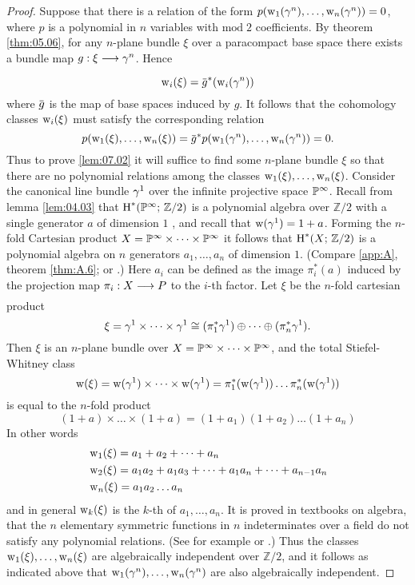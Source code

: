 \documentclass[../main]{subfiles}
\begin{document}
\begin{proof}
Suppose that there is a relation of the form $p(\operatorname{w}_{1}(\gamma^{n}), \dots,\operatorname{w}_{n}(\gamma^{n}))=0$, where $p$ is a polynomial in $n$ variables with $\mathrm{mod}\; 2$ coefficients. By theorem \ref{thm:05.06}, for any $n$-plane bundle $\xi$ over a paracompact base space there exists a bundle map $g:\xi\varrightarrow{} \tautological^n$. Hence
\[\sw_{i}(\xi)=\xoverline{g}^{\ast}(\sw_{i}(\tautological^{n}))\]
where $\xoverline{g}$ is the map of base spaces induced by $g$. It follows that the cohomology classes $\operatorname{w}_{i}(\xi)$ must satisfy the corresponding relation
\[p(\sw_{1}(\xi), \dots, \sw_{n}(\xi))=\xoverline{g}^{\ast} p(\sw_{1}(\tautological^{n}), \dots, \sw_{n}(\tautological^{n}))=0.\]
Thus to prove \ref{lem:07.02} it will suffice to find some $n$-plane bundle $\xi$ so that there are no polynomial relations among the classes $\operatorname{w}_{1}(\xi), \dots, \operatorname{w}_{n}(\xi)$. Consider the canonical line bundle $\gamma^{1}$ over the infinite projective space $\mathbb{P}^\infty $. Recall from lemma \ref{lem:04.03} that $\operatorname{H}^{\ast}(\mathbb{P}^\infty ; \, \mathbb{Z} / 2)$ is a polynomial algebra over $\mathbb{Z} / 2$ with a single generator $a$ of dimension $1$ , and recall that $\operatorname{w}(\gamma^{1})=1+a$. Forming the $n$-fold Cartesian product $X=\mathbb{P}^\infty \times \dots \times \mathbb{P}^\infty$ it follows that $\operatorname{H}^{\ast}(X ; \, \mathbb{Z} / 2)$ is a polynomial algebra on $n$ generators $a_{1}, \dots, a_{n}$ of dimension $1 $. (Compare \ref{app:A}, theorem \ref{thm:A.6}; or \cite[p. 247]{spanier1981}.) Here  $a_{i}$ can be defined as the image $\pi_{i}^{\ast}(a)$ induced by the projection map $\pi_i:X\varrightarrow{} P$ to the $i$-th factor. Let $\xi$ be the $n$-fold cartesian product
\[\xi=\gamma^{1} \times \dots \times \gamma^{1} \cong(\pi_{1}^{\ast} \gamma^{1}) \oplus \dots \oplus(\pi_{n}^{\ast} \gamma^{1}).\]
Then $\xi$ is an $n$-plane bundle over $X=\mathbb{P}^\infty \times \dots \times \mathbb{P}^\infty$, and the total Stiefel-Whitney class
\[
\operatorname{w}(\xi)=\operatorname{w}(\gamma^{1}) \times \dots \times \operatorname{w}(\gamma^{1})=\pi_{1}^{\ast}(\operatorname{w}(\gamma^{1})) \dots \pi_{n}^{\ast}(\operatorname{w}(\gamma^{1}))
\]
is equal to the $n$-fold product
\[
(1+a) \times \dots \times(1+a)=(1+a_{1})(1+a_{2}) \dots(1+a_{n})
\]
In other words
\begin{align*}
	&\operatorname{w}_{1}(\xi)=a_{1}+a_{2}+\dots+a_{n} \\
	&\operatorname{w}_{2}(\xi)=a_{1} a_{2}+a_{1} a_{3}+\dots+a_{1} a_{n}+\dots+a_{n-1} a_{n} \\
	&\operatorname{w}_{n}(\xi)=a_{1} a_{2} \dots a_{n}
\end{align*}
and in general $\operatorname{w}_{k}(\xi)$ is the $k$-th  of $a_{1}, \dots, a_{n} $. It is proved in textbooks on algebra, that the $n$ elementary symmetric functions in $n$ indeterminates over a field do not satisfy any polynomial relations. (See for example \cite[pp 132-134]{lang1965algebra} or \cite[pp. 79,176]{waerden1970}.) Thus the classes $\operatorname{w}_{1}(\xi), \dots, \operatorname{w}_{n}(\xi)$ are algebraically independent over $\mathbb{Z} / 2$, and it follows as indicated above that $\operatorname{w}_{1}(\gamma^{n}), \dots, \operatorname{w}_{n}(\gamma^{n})$ are also algebraically independent.
\end{proof}
\end{document}
